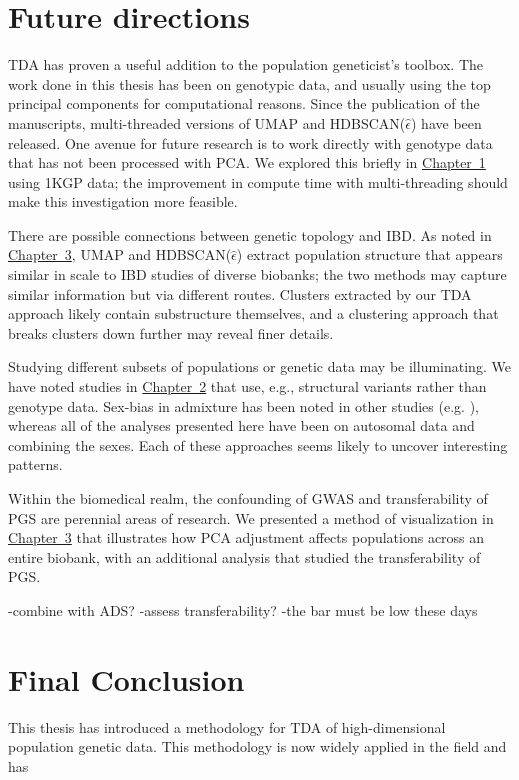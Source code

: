 \section{Future directions}

TDA has proven a useful addition to the population geneticist's toolbox. The work done in this thesis has been on genotypic data, and usually using the top principal components for computational reasons. Since the publication of the manuscripts, multi-threaded versions of UMAP and HDBSCAN($\hat{\epsilon}$) have been released. One avenue for future research is to work directly with genotype data that has not been processed with PCA. We explored this briefly in \hyperref[chap:chapter1]{Chapter~1} using 1KGP data; the improvement in compute time with multi-threading should make this investigation more feasible.

There are possible connections between genetic topology and IBD. As noted in \hyperref[chap:chapter3]{Chapter~3}, UMAP and HDBSCAN($\hat{\epsilon}$) extract population structure that appears similar in scale to IBD studies of diverse biobanks; the two methods may capture similar information but via different routes. Clusters extracted by our TDA approach likely contain substructure themselves, and a clustering approach that breaks clusters down further may reveal finer details.

Studying different subsets of populations or genetic data may be illuminating. We have noted studies in \hyperref[chap:chapter2]{Chapter~2} that use, e.g., structural variants rather than genotype data. Sex-bias in admixture has been noted in other studies (e.g. \citep{ongaro_evaluating_2021,korunes_sex,marcheco-teruel_cuba_2014}), whereas all of the analyses presented here have been on autosomal data and combining the sexes. Each of these approaches seems likely to uncover interesting patterns.

Within the biomedical realm, the confounding of GWAS and transferability of PGS are perennial areas of research. We presented a method of visualization in \hyperref[chap:chapter3]{Chapter~3} that illustrates how PCA adjustment affects populations across an entire biobank, with an additional analysis that studied the transferability of PGS.

-combine with ADS?
-assess transferability?
-the bar must be low these days


\section{Final Conclusion}
This thesis has introduced a methodology for TDA of high-dimensional population genetic data. This methodology is now widely applied in the field and has 


